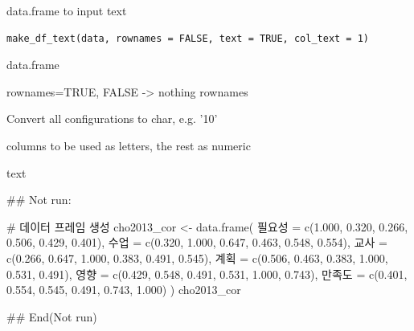 \documentclass[a4paper]{book}
\begin{document}
%
\begin{Description}
data.frame to input text
\end{Description}
%
\begin{Usage}
\begin{verbatim}
make_df_text(data, rownames = FALSE, text = TRUE, col_text = 1)
\end{verbatim}
\end{Usage}
%
\begin{Arguments}
\begin{ldescription}
\item[\code{data}] data.frame

\item[\code{rownames}] rownames=TRUE, FALSE -> nothing rownames

\item[\code{text}] Convert all configurations to char, e.g. '10'

\item[\code{col\_text}] columns to be used as letters, the rest as numeric
\end{ldescription}
\end{Arguments}
%
\begin{Value}
text
\end{Value}
%
\begin{Examples}
\begin{ExampleCode}

\#\# Not run: 

# 데이터 프레임 생성
cho2013_cor <- data.frame(
  필요성 = c(1.000, 0.320, 0.266, 0.506, 0.429, 0.401),
  수업 = c(0.320, 1.000, 0.647, 0.463, 0.548, 0.554),
  교사 = c(0.266, 0.647, 1.000, 0.383, 0.491, 0.545),
  계획 = c(0.506, 0.463, 0.383, 1.000, 0.531, 0.491),
  영향 = c(0.429, 0.548, 0.491, 0.531, 1.000, 0.743),
  만족도 = c(0.401, 0.554, 0.545, 0.491, 0.743, 1.000)
)
cho2013_cor %



## End(Not run)

\end{ExampleCode}
\end{Examples}
\end{document}
